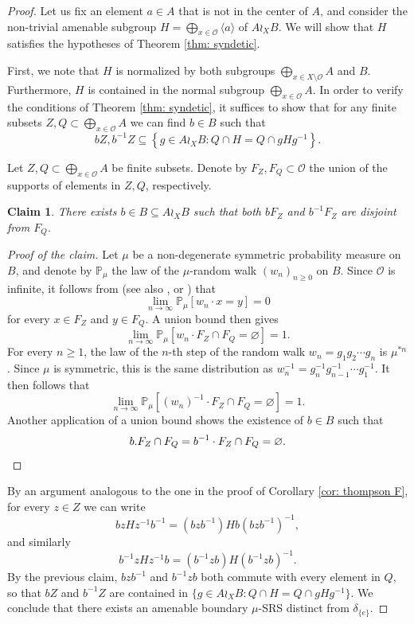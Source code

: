 \documentclass[reqno,a4paper,11pt]{amsart}
\numberwithin{equation}{section}
\newcommand{\1}{\mathbf{1}}
\def\P{{\mathbb P}}
\def\cO{{\mathcal O}}
\let\emptyset\varnothing
\newtheorem*{claim}{Claim}
\theoremstyle{definition}
\begin{document}
	\begin{proof}
		
		Let us fix an element $a \in A$ that is not in the center of $A$, and consider the non-trivial amenable subgroup $H = \bigoplus_{x \in \cO} \langle a \rangle$ of $A\wr_X B$. We will show that $H$ satisfies the hypotheses of Theorem \ref{thm: syndetic}.
		
		
		First, we note that $H$ is normalized by both subgroups $\bigoplus_{x \in X \setminus \cO} A$ and $B$. Furthermore, $H$ is contained in the normal subgroup $\bigoplus_{x \in \cO} A$. In order to verify the conditions of Theorem \ref{thm: syndetic}, it suffices to show that for any finite subsets $Z,Q \subset \bigoplus_{x \in \cO} A$ we can find $b\in B$ such that  
		\[
		bZ,b^{-1}Z\subseteq \left\{g\in A\wr_X B : Q\cap H=Q\cap gHg^{-1}\right\}.
		\]
		
		Let $Z,Q \subset \bigoplus_{x \in \cO} A$ be finite subsets. Denote by $F_Z, F_Q \subset \cO$ the union of the supports of elements in $Z, Q$, respectively.
		\begin{claim}
			There exists $b \in B \subseteq A \wr_X B$ such that both $bF_Z$ and  $b^{-1}F_Z$ are disjoint from $F_Q$.
		\end{claim}
		\begin{proof}[Proof of the claim]
			Let $\mu$ be a non-degenerate symmetric probability measure on $B$, and denote by $\P_\mu$ the law of the $\mu$-random walk $(w_n)_{n \geq 0}$ on $B$. Since $\cO$ is infinite, it follows from \cite[Lemma 3.1]{ChawlaFrisch2025} (see also \cite[Claim 2.3]{GorokhovskyMatteBonTamuz2024}, or \cite[Lemma 3.2]{LeBoudecMatteBon2018}) that
			\[
			\lim_{n \to \infty} \P_\mu[w_n\cdot x = y] = 0
			\]
			for every $x \in F_Z$ and $y \in F_Q$. A union bound then gives 
			\[
			\lim_{n \to \infty} \P_\mu[w_n\cdot F_Z \cap F_Q = \emptyset] = 1.
			\]
			For every $n \ge 1$, the law of the $n$-th step of the random walk $w_n = g_1g_2\cdots g_n$ is $\mu^{\ast n}$. Since $\mu$ is symmetric, this is the same distribution as $w_n^{-1} = g_n^{-1}g_{n-1}^{-1}\cdots g_1^{-1}$. It then follows that
			\[
			\lim_{n \to \infty} \P_\mu[(w_n)^{-1}\cdot F_Z \cap F_Q = \emptyset] = 1.
			\]
			Another application of a union bound shows the existence of $b \in B$ such that
			\[
			b.F_Z \cap F_Q = b^{-1}\cdot F_Z \cap F_Q = \emptyset. \qedhere
			\]
		\end{proof}
		
		By an argument analogous to the one in the proof of Corollary \ref{cor: thompson F}, for every $z \in Z$ we can write
		\[
		bzHz^{-1}b^{-1} = (bzb^{-1}) Hb(bzb^{-1})^{-1},\]
		and similarly
		\[
		b^{-1}zHz^{-1}b = (b^{-1}zb) H (b^{-1}zb)^{-1}.
		\]
		By the previous claim, $bzb^{-1}$ and $b^{-1}zb$ both commute with every element in $Q$, so that $bZ$ and $b^{-1}Z$ are contained in $\{g \in A\wr_X B : Q \cap H = Q \cap gHg^{-1}\}$. We conclude that there exists an amenable boundary $\mu$-SRS distinct from $\delta_{\{e\}}$.
	\end{proof}
	
\end{document}
